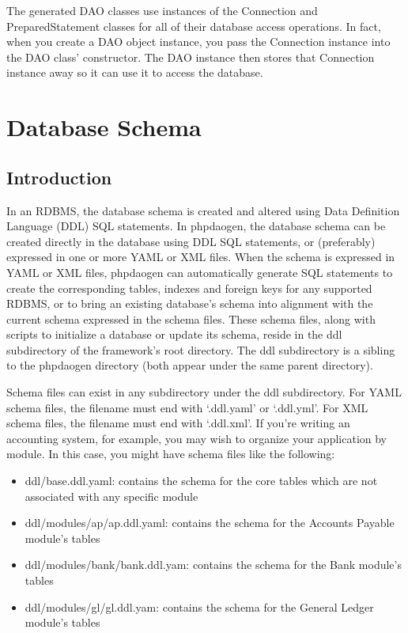 \documentclass[letterpaper,10pt,english]{sphinxmanual}
\begin{document}
The generated DAO classes use instances of the Connection and PreparedStatement classes for all of
their database access operations.  In fact, when you create a DAO object instance, you pass the
Connection instance into the DAO class' constructor.  The DAO instance then stores that Connection
instance away so it can use it to access the database.


\section{Database Schema}
\label{jaxFrameworkGuide:database-schema}

\subsection{Introduction}
\label{jaxFrameworkGuide:id15}
In an RDBMS, the database schema is created and altered using Data Definition Language (DDL) SQL
statements.  In phpdaogen, the database schema can be created directly in the database using DDL SQL
statements, or (preferably) expressed in one or more YAML or XML files.  When the schema is
expressed in YAML or XML files, phpdaogen can automatically generate SQL statements to create the
corresponding tables, indexes and foreign keys for any supported RDBMS, or to bring an existing
database's schema into alignment with the current schema expressed in the schema files.  These
schema files, along with scripts to initialize a database or update its schema, reside in the ddl
subdirectory of the framework's root directory.  The ddl subdirectory is a sibling to the phpdaogen
directory (both appear under the same parent directory).

Schema files can exist in any subdirectory under the ddl subdirectory.  For YAML schema files, the
filename must end with `.ddl.yaml' or `.ddl.yml'.  For XML schema files, the filename must end with
`.ddl.xml'.  If you're writing an accounting system, for example, you may wish to organize your
application by module.  In this case, you might have schema files like the following:
\begin{itemize}
\item {} 
ddl/base.ddl.yaml: contains the schema for the core tables which are not associated with any
specific module

\item {} 
ddl/modules/ap/ap.ddl.yaml: contains the schema for the Accounts Payable module's tables

\item {} 
ddl/modules/bank/bank.ddl.yam: contains the schema for the Bank module's tables

\item {} 
ddl/modules/gl/gl.ddl.yam: contains the schema for the General Ledger module's tables

\end{itemize}
\end{document}
